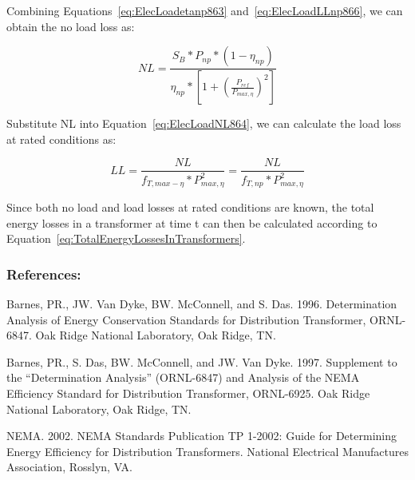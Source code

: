 Combining Equations~\ref{eq:ElecLoadetanp863} and~\ref{eq:ElecLoadLLnp866}, we can obtain the no load loss as:

\begin{equation}
NL = \frac{{{S_B}*{P_{np}}*(1 - {\eta_{np}})}}{{{\eta_{np}}*\left[ {1 + {{\left( {\frac{{{P_{ref}}}}{{P{}_{max,\eta}}}} \right)}^2}} \right]}}
\label{eq:NoLoadLossAtRatedCondition}
\end{equation}

Substitute NL into Equation~\ref{eq:ElecLoadNL864}, we can calculate the load loss at rated conditions as:

\begin{equation}
LL = \frac{{NL}}{{{f_{T,max-\eta}}*P_{max,\eta}^2}} = \frac{{NL}}{{{f_{T,np}}*P_{max,\eta}^2}}
\label{eq:LoadLossAtRatedCondition}
\end{equation}

Since both no load and load losses at rated conditions are known, the total energy losses in a transformer at time t can then be calculated according to Equation~\ref{eq:TotalEnergyLossesInTransformers}.

\subsubsection{References:}\label{references-1-008}

Barnes, PR., JW. Van Dyke, BW. McConnell, and S. Das. 1996. Determination Analysis of Energy Conservation Standards for Distribution Transformer, ORNL-6847. Oak Ridge National Laboratory, Oak Ridge, TN.

Barnes, PR., S. Das, BW. McConnell, and JW. Van Dyke. 1997. Supplement to the ``Determination Analysis'' (ORNL-6847) and Analysis of the NEMA Efficiency Standard for Distribution Transformer, ORNL-6925. Oak Ridge National Laboratory, Oak Ridge, TN.

NEMA. 2002. NEMA Standards Publication TP 1-2002: Guide for Determining Energy Efficiency for Distribution Transformers. National Electrical Manufactures Association, Rosslyn, VA.
